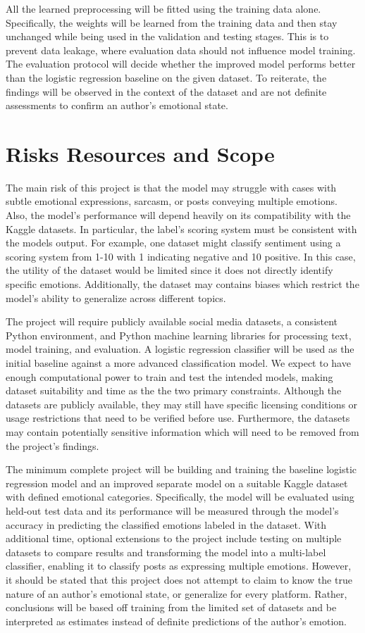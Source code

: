 \documentclass[sigconf,nonacm]{acmart}
\begin{document}
All the learned preprocessing will be fitted using the training data alone. Specifically, the weights will be learned from the training data and then stay unchanged while being used in the validation and testing stages. This is to prevent data leakage, where evaluation data should not influence model training. The evaluation protocol will decide whether the improved model performs better than the logistic regression baseline on the given dataset. To reiterate, the findings will be observed in the context of the dataset and are not definite assessments to confirm an author's emotional state.

\section{Risks Resources and Scope}
The main risk of this project is that the model may struggle with cases with subtle emotional expressions, sarcasm, or posts conveying multiple emotions. Also, the model's performance will depend heavily on its compatibility with the Kaggle datasets. In particular, the label's scoring system must be consistent with the models output. For example, one dataset might classify sentiment using a scoring system from 1-10 with 1 indicating negative and 10 positive. In this case, the utility of the dataset would be limited since it does not directly identify specific emotions. Additionally, the dataset may contains biases which restrict the model's ability to generalize across different topics.

The project will require publicly available social media datasets, a consistent Python environment, and Python machine learning libraries for processing text, model training, and evaluation. A logistic regression classifier will be used as the initial baseline against a more advanced classification model. We expect to have enough computational power to train and test the intended models, making dataset suitability and time as the the two primary constraints. Although the datasets are publicly available, they may still have specific licensing conditions or usage restrictions that need to be verified before use. Furthermore, the datasets may contain potentially sensitive information which will need to be removed from the project's findings.

The minimum complete project will be building and training the baseline logistic regression model and an improved separate model on a suitable Kaggle dataset with defined emotional categories. Specifically, the model will be evaluated using held-out test data and its performance will be measured through the model's accuracy in predicting the classified emotions labeled in the dataset. With additional time, optional extensions to the project include testing on multiple datasets to compare results and transforming the model into a multi-label classifier, enabling it to classify posts as expressing multiple emotions. However, it should be stated that this project does not attempt to claim to know the true nature of an author's emotional state, or generalize for every platform. Rather, conclusions will be based off training from the limited set of datasets and be interpreted as estimates instead of definite predictions of the author's emotion.
\end{document}
